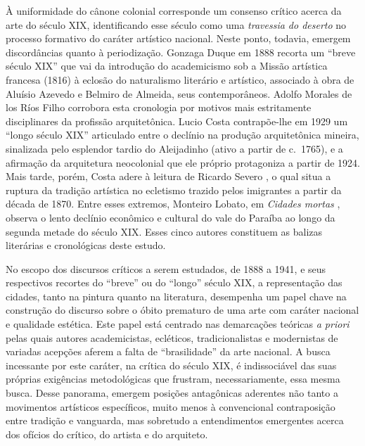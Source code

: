 À uniformidade do cânone colonial corresponde um consenso crítico acerca
da arte do século XIX, identificando esse século como uma
\emph{travessia do deserto} no processo formativo do caráter artístico
nacional. Neste ponto, todavia, emergem discordâncias quanto à
periodização. Gonzaga Duque em 1888 \autocite*{gonzagaduque:1995arte}
recorta um ``breve século XIX'' que vai da introdução do academicismo
sob a Missão artística francesa (1816) à eclosão do naturalismo
literário e artístico, associado à obra de Aluísio Azevedo e Belmiro de
Almeida, seus contemporâneos. Adolfo Morales de los Ríos Filho
\autocite*{morales:1941grandjean} corrobora esta cronologia por motivos
mais estritamente disciplinares da profissão arquitetônica. Lucio Costa
\autocite*{costa:2007aleijadinho} contrapõe-lhe em 1929 um ``longo
século XIX'' articulado entre o declínio na produção arquitetônica
mineira, sinalizada pelo esplendor tardio do Aleijadinho (ativo a partir
de c.~1765), e a afirmação da arquitetura neocolonial que ele próprio
protagoniza a partir de 1924. Mais tarde, porém, Costa adere à leitura
de Ricardo Severo \autocite*{severo:1917arte}, o qual situa a ruptura da
tradição artística no ecletismo trazido pelos imigrantes a partir da
década de 1870. Entre esses extremos, Monteiro Lobato, em \emph{Cidades
mortas} \autocite*{monteirolobato:1919cidades}, observa o lento declínio
econômico e cultural do vale do Paraíba ao longo da segunda metade do
século XIX. Esses cinco autores constituem as balizas literárias e
cronológicas deste estudo.

No escopo dos discursos críticos a serem estudados, de 1888 a 1941, e
seus respectivos recortes do ``breve'' ou do ``longo'' século XIX, a
representação das cidades, tanto na pintura quanto na literatura,
desempenha um papel chave na construção do discurso sobre o óbito
prematuro de uma arte com caráter nacional e qualidade estética. Este
papel está centrado nas demarcações teóricas \emph{a priori} pelas quais
autores academicistas, ecléticos, tradicionalistas e modernistas de
variadas acepções aferem a falta de ``brasilidade'' da arte nacional. A
busca incessante por este caráter, na crítica do século XIX, é
indissociável das suas próprias exigências metodológicas que frustram,
necessariamente, essa mesma busca. Desse panorama, emergem posições
antagônicas aderentes não tanto a movimentos artísticos específicos,
muito menos à convencional contraposição entre tradição e vanguarda, mas
sobretudo a entendimentos emergentes acerca dos ofícios do crítico, do
artista e do arquiteto.
